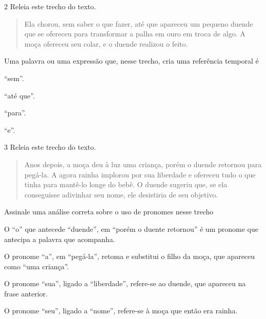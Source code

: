 
\num{2} Releia este trecho do texto.

\begin{quote}
Ela chorou, sem saber o que fazer, até que apareceu um pequeno duende que se
ofereceu para transformar a palha em ouro em troca de algo. A moça
ofereceu seu colar, e o duende realizou o feito.
\end{quote}

Uma palavra ou uma expressão que, nesse trecho, cria uma referência temporal é

\begin{minipage}{.5\textwidth}
\begin{escolha}
\item “sem”.

\item “até que”.

\item “para”.

\item “e”.
\end{escolha}
\end{minipage}


\num{3} Releia este trecho do texto.

\begin{quote}
Anos depois, a moça deu à luz uma criança, porém o duende retornou para
pegá-la. A agora rainha implorou por sua liberdade e ofereceu tudo o que
tinha para mantê-lo longe do bebê. O duende sugeriu que, se ela
conseguisse adivinhar seu nome, ele desistiria de seu objetivo.
\end{quote}

Assinale uma análise correta sobre o uso de pronomes nesse trecho

\begin{escolha}
\item O “o” que antecede “duende”, em “porém o duente retornou” é um pronome que antecipa a palavra que acompanha.

\item O pronome “a”, em “pegá-la”, retoma e substitui o filho da moça, que apareceu como “uma criança”.

\item O pronome “sua”, ligado a “liberdade”, refere-se ao duende, que apareceu na frase anterior.

\item O pronome “seu”, ligado a “nome”, refere-se à moça que então era rainha.
\end{escolha}






